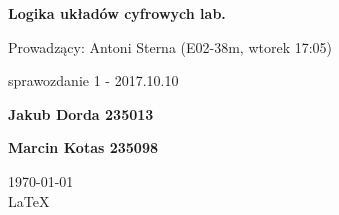 \documentclass[12pt,a4paper]{report}
\begin{document}
	
	\begin{titlepage}
		
		\centering
		{\huge\bfseries Logika układów cyfrowych lab.\par}
		
		\vspace{0.5cm}
		Prowadzący: Antoni Sterna (E02-38m, wtorek 17:05) \\
	
		\vspace{1.1cm}
		{\Large sprawozdanie 1 - 2017.10.10\par}
		\vfill
		
		{\large\bfseries Jakub Dorda 235013\par}
		{\large\bfseries Marcin Kotas 235098\par}
		
		\vspace{1cm}
		\today \\ \LaTeX
		
		\restoregeometry
	\end{titlepage}
	
	
	
	
\end{document}
